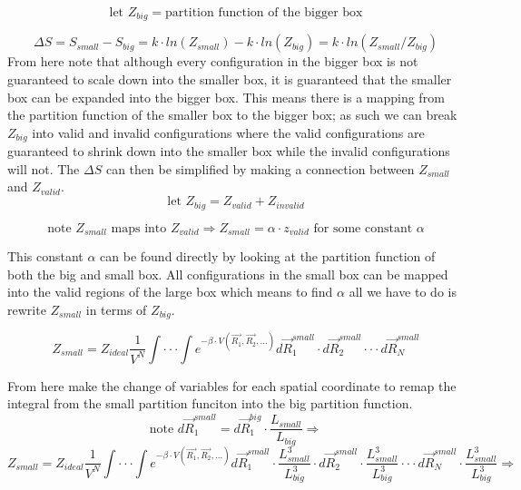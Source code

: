 \begin{equation}\label{eq:MCHS10}
\text{let }Z_{big}=\text{partition function of the bigger box}
\end{equation}

\begin{equation}\label{eq:MCHS11}
\Delta S=S_{small}-S_{big}=k\cdot ln(Z_{small})-k\cdot ln(Z_{big})=k\cdot ln(Z_{small}/Z_{big})
\end{equation}
From here note that although every configuration in the bigger box is not guaranteed to scale down into the smaller box, it is guaranteed that the smaller box can be expanded into the bigger box. This means there is a mapping from the partition function of the smaller box to the bigger box; as such we can break $Z_{big}$ into valid and invalid configurations where the valid configurations are guaranteed to shrink down into the smaller box while the invalid configurations will not. The $\Delta S$ can then be simplified by making a connection between $Z_{small}$ and $Z_{valid}$.
\begin{equation}\label{eq:MCHS12}
\text{let }Z_{big}=Z_{valid}+Z_{invalid}
\end{equation}

\begin{equation}\label{eq:MCHS13}
\text{note }Z_{small}\text{ maps into }Z_{valid} \Rightarrow Z_{small}=\alpha\cdot z_{valid}\text{ for some constant } \alpha
\end{equation}

This constant $\alpha$ can be found directly by looking at the partition function of both the big and small box. All configurations in the small box can be mapped into the valid regions of the large box which means to find $\alpha$ all we have to do is rewrite $Z_{small}$ in terms of $Z_{big}$.

\begin{equation}\label{eq:MCHS14}
Z_{small}=Z_{ideal}\frac{1}{V^N}\int\cdot\cdot\cdot\int e^{-\beta\cdot V(\vec{R_1},\vec{R_2},...)}d\vec{R}_1^{small}\cdot d\vec{R}_2^{small}\cdot\cdot\cdot d\vec{R}_N^{small}
\end{equation}

From here make the change of variables for each spatial coordinate to remap the integral from the small partition funciton into the big partition function.
\begin{equation}\label{eq:MCHS15}
\text{note }d\vec{R}_1^{small}=d\vec{R}_1^{big}\cdot \frac{L_{small}}{L_{big}}\Rightarrow
\end{equation}
\begin{equation}\label{eq:MCHS16}
Z_{small}=Z_{ideal}\frac{1}{V^N}\int\cdot\cdot\cdot\int e^{-\beta\cdot V(\vec{R_1},\vec{R_2},...)}d\vec{R}_1^{small}\cdot \frac{L_{small}^3}{L_{big}^3}\cdot d\vec{R}_2^{small}\cdot \frac{L_{small}^3}{L_{big}^3}\cdot\cdot\cdot d\vec{R}_N^{small}\cdot \frac{L_{small}^3}{L_{big}^3}\Rightarrow
\end{equation}

